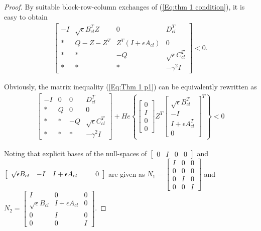 \documentclass[journal,onecolumn]{IEEEtran}
\begin{document}
\begin{proof}
By suitable block-row-column exchanges of (\ref{Eq:thm 1
condition}), it is easy to obtain
\begin{equation}\begin{array}{l}
\label{Eq:Thm 1 p1} \left[\begin{array}{ccccc}-
I&\sqrt{\epsilon}B_{cl}^TZ&0&D_{cl}^T\\{*}&Q-Z-Z^T&Z^T(I+\epsilon
A_{cl})
&0\\{*}&{*}&-Q&\sqrt{\epsilon}C_{cl}^T\\{*}&{*}&{*}&-\gamma^2 I
\end{array}\right]<0.\end{array}
\end{equation}

 Obviously, the matrix inequality (\ref{Eq:Thm 1 p1}) can
be equivalently rewritten as
\begin{equation}\begin{array}{l} \label{Eq:Thm 1 p2}
\left[\begin{array}{ccccc}- I&
0&0&D_{cl}^T\\{*}&Q&0&0\\{*}&{*}&-Q&\sqrt{\epsilon}C_{cl}^T\\{*}&{*}&{*}&-\gamma^2I
\end{array}\right]+He\left\{\left[\begin{array}{c}0\\I\\0\\0\end{array}\right]Z^T\left[\begin{array}{c}
\sqrt{\epsilon}B_{cl}^T\\-I\\I+\epsilon
A_{cl}^T\\0\end{array}\right]^T\right\}<0\end{array}
\end{equation}

Noting that explicit bases of the  null-spaces of
$\left[\begin{array}{ccccc}0&I&0&0\end{array}\right]$ and
$\left[\begin{array}{ccc} \sqrt{\epsilon}B_{cl}&-I&I+\epsilon
A_{cl}\end{array}\right. \\
\left.\begin{array}{cc}&0\end{array}\right]$ are given as
$N_1=\left[\begin{array}{cccc}I&0&0\\0&0&0\\0&I&0\\0&0&I\end{array}\right]$
 and
$N_2=\left[\begin{array}{cccc}I&0&0\\\sqrt{\epsilon}B_{cl}&I+\epsilon
A_{cl}&0\\0&I&0\\0&0&I\end{array}\right]$.


\end{proof}
\end{document}

